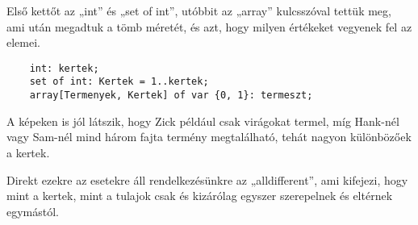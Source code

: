 \documentclass[12pt,a4paper,twoside, openright]{report}
\begin{document}
    Első kettőt az „int” és „set of int”, utóbbit az „array” kulcsszóval tettük meg, ami után megadtuk a tömb méretét, és azt, hogy milyen értékeket vegyenek fel az elemei.
	\begin{lstlisting}
	int: kertek;
	set of int: Kertek = 1..kertek;
	array[Termenyek, Kertek] of var {0, 1}: termeszt; \end{lstlisting}
	
    A képeken is jól látszik, hogy Zick például csak virágokat termel, míg Hank-nél vagy 
    Sam-nél mind három fajta termény megtalálható, tehát nagyon különbözőek a kertek.

    Direkt ezekre az esetekre áll rendelkezésünkre az „alldifferent”, ami kifejezi, hogy mint a kertek, mint a tulajok csak és kizárólag egyszer szerepelnek és eltérnek egymástól.
    
\end{document}
